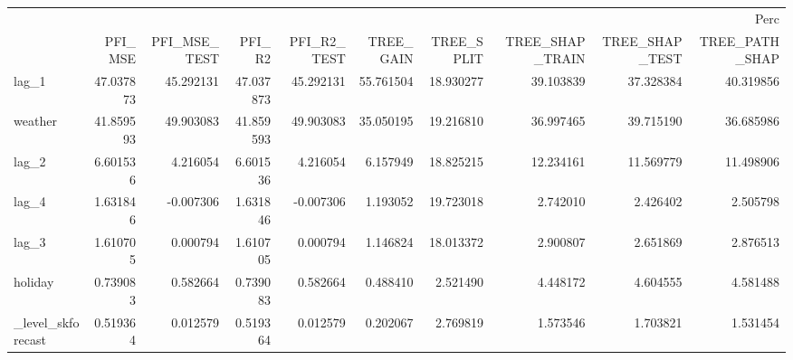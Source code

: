 \begin{tabular}{lrrrrrrrrr}
\toprule
 & \multicolumn{9}{r}{Perc} \\
 & PFI_MSE & PFI_MSE_TEST & PFI_R2 & PFI_R2_TEST & TREE_GAIN & TREE_SPLIT & TREE_SHAP_TRAIN & TREE_SHAP_TEST & TREE_PATH_SHAP \\
\midrule
lag_1 & 47.037873 & 45.292131 & 47.037873 & 45.292131 & 55.761504 & 18.930277 & 39.103839 & 37.328384 & 40.319856 \\
weather & 41.859593 & 49.903083 & 41.859593 & 49.903083 & 35.050195 & 19.216810 & 36.997465 & 39.715190 & 36.685986 \\
lag_2 & 6.601536 & 4.216054 & 6.601536 & 4.216054 & 6.157949 & 18.825215 & 12.234161 & 11.569779 & 11.498906 \\
lag_4 & 1.631846 & -0.007306 & 1.631846 & -0.007306 & 1.193052 & 19.723018 & 2.742010 & 2.426402 & 2.505798 \\
lag_3 & 1.610705 & 0.000794 & 1.610705 & 0.000794 & 1.146824 & 18.013372 & 2.900807 & 2.651869 & 2.876513 \\
holiday & 0.739083 & 0.582664 & 0.739083 & 0.582664 & 0.488410 & 2.521490 & 4.448172 & 4.604555 & 4.581488 \\
_level_skforecast & 0.519364 & 0.012579 & 0.519364 & 0.012579 & 0.202067 & 2.769819 & 1.573546 & 1.703821 & 1.531454 \\
\bottomrule
\end{tabular}
